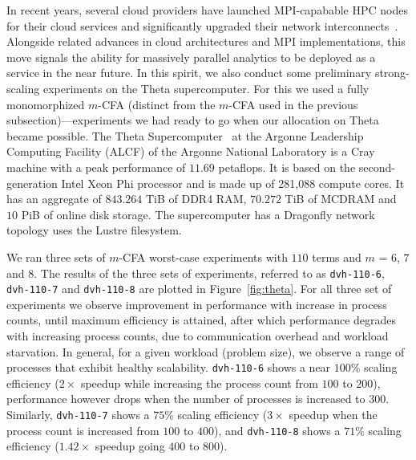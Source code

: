 In recent years, several cloud providers have launched MPI-capabable
HPC nodes for their cloud services and significantly upgraded their
network
interconnects~\cite{azure-august2019,parallelcluster}. Alongside
related advances in cloud architectures and MPI implementations, this
move signals the ability for massively parallel analytics to be
deployed as a service in the near future. In this spirit, we also
conduct some preliminary strong-scaling experiments on the Theta
supercomputer. For this we used a fully monomorphized $m$-CFA
(distinct from the $m$-CFA used in the previous
subsection)---experiments we had ready to go when our allocation on
Theta became possible. The Theta Supercomputer~\cite{parker2017early}
at the Argonne Leadership Computing Facility (ALCF) of the Argonne
National Laboratory is a Cray machine with a peak performance of
$11.69$ petaflops. It is based on the second-generation Intel Xeon Phi
processor and is made up of 281,088 compute cores. It has an aggregate
of $843.264$ TiB of DDR4 RAM, $70.272$ TiB of MCDRAM and $10$ PiB of
online disk storage. The supercomputer has a Dragonfly network
topology uses the Lustre filesystem.


We ran three sets of $m$-CFA worst-case experiments with $110$ terms
and $m$ = $6$, $7$ and $8$. The results of the three sets of
experiments, referred to as \texttt{dvh-110-6}, \texttt{dvh-110-7} and
\texttt{dvh-110-8} are plotted in Figure~\ref{fig:theta}. For all
three set of experiments we observe improvement in performance with
increase in process counts, until maximum efficiency is attained,
after which performance degrades with increasing process counts, due
to communication overhead and workload starvation. In general, for a
given workload (problem size), we observe a range of processes that
exhibit healthy scalability. \texttt{dvh-110-6} shows a near $100\%$
scaling efficiency ($2\times$ speedup while increasing the process
count from $100$ to $200$), performance however drops when the number
of processes is increased to 300. Similarly, \texttt{dvh-110-7} shows
a $75\%$ scaling efficiency ($3\times$ speedup when the process count
is increased from $100$ to $400$), and \texttt{dvh-110-8} shows a
$71\%$ scaling efficiency ($1.42\times$ speedup going $400$ to $800$).


